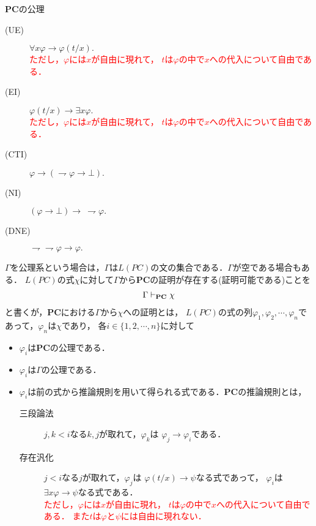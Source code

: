 \begin{description}
\begin{itembox}[l]{{\bf PC}の公理}
\begin{description}
			\item[(UE)] $\forall x \varphi \rightarrow \varphi(t/x).$
				\\ \textcolor{red}{ただし，$\varphi$には$x$が自由に現れて，
				$t$は$\varphi$の中で$x$への代入について自由である．}
				
			\item[(EI)] $\varphi(t/x) \rightarrow \exists x \varphi.$
				\\ \textcolor{red}{ただし，$\varphi$には$x$が自由に現れて，
				$t$は$\varphi$の中で$x$への代入について自由である．}
				
			\item[(CTI)] $\varphi \rightarrow (\rightharpoondown \varphi \rightarrow \bot).$
			
			\item[(NI)] $(\varphi \rightarrow \bot) \rightarrow\ \rightharpoondown \varphi.$
			\item[(DNE)] $\rightharpoondown \rightharpoondown \varphi \rightarrow \varphi.$
		\end{description}
	\end{itembox}
	
	$\Gamma$を公理系という場合は，$\Gamma$は$L(PC)$の文の集合である．$\Gamma$が空である場合もある．
	$L(PC)$の式$\chi$に対して$\Gamma$から{\bf PC}の証明が存在する(証明可能である)ことを
	\begin{align}
		\Gamma \vdash_{{\scriptsize \mbox{{\bf PC}}}} \chi
	\end{align}
	と書くが，{\bf PC}における$\Gamma$から$\chi$への証明とは，
	$L(PC)$の式の列$\varphi_{1},\varphi_{2},
	\cdots,\varphi_{n}$であって，$\varphi_{n}$は$\chi$であり，
	各$i \in \{1,2,\cdots,n\}$に対して
	\begin{itemize}
		\item $\varphi_{i}$は{\bf PC}の公理である．
		\item $\varphi_{i}$は$\Gamma$の公理である．
		\item $\varphi_{i}$は前の式から推論規則を用いて得られる式である．{\bf PC}の推論規則とは，
			\begin{description}
			\item[三段論法]
				$j,k < i$なる$k,j$が取れて，$\varphi_{k}$は
				$\varphi_{j} \rightarrow \varphi_{i}$である．
			 	
			\item[存在汎化] 
				$j < i$なる$j$が取れて，$\varphi_{j}$は
				$\varphi(t/x) \rightarrow \psi$なる式であって，
				$\varphi_{i}$は$\exists x \varphi \rightarrow \psi$なる式である．
				\\ \textcolor{red}{ただし，$\varphi$には$x$が自由に現れ，
				$t$は$\varphi$の中で$x$への代入について自由である．
				また$t$は$\varphi$と$\psi$には自由に現れない．}
			

\end{description}
\end{itemize}
\end{description}
